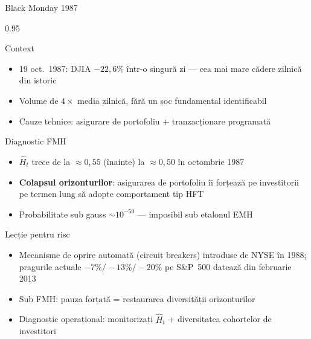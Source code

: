 \documentclass[9pt, aspectratio=169, t]{beamer}
\begin{document}
\begin{frame}[shrink=15]{Black Monday 1987}
\begin{cminipage}{0.95\textwidth}
\begin{block}{Context}
\begin{itemize}\setlength{\itemsep}{0pt}
    \item 19 oct.\ 1987: DJIA $-22{,}6\%$ într-o singură zi --- cea mai mare cădere zilnică din istoric
    \item Volume de $4\times$ media zilnică, fără un șoc fundamental identificabil
    \item Cauze tehnice: asigurare de portofoliu + tranzacționare programată
\end{itemize}
\end{block}
\begin{alertblock}{Diagnostic FMH}
\begin{itemize}\setlength{\itemsep}{0pt}
    \item $\hat H_t$ trece de la $\approx 0{,}55$ (înainte) la $\approx 0{,}50$ în octombrie 1987
    \item \textbf{Colapsul orizonturilor}: asigurarea de portofoliu îi forțează pe investitorii pe termen lung să adopte comportament tip HFT
    \item Probabilitate sub gauss $\sim 10^{-50}$ --- imposibil sub etalonul EMH
\end{itemize}
\end{alertblock}
\begin{exampleblock}{Lecție pentru risc}
\begin{itemize}\setlength{\itemsep}{0pt}
    \item Mecanisme de oprire automată (circuit breakers) introduse de NYSE în 1988; pragurile actuale $-7\%/-13\%/-20\%$ pe S\&P~500 datează din februarie 2013
    \item Sub FMH: pauza forțată = restaurarea diversității orizonturilor
    \item Diagnostic operațional: monitorizați $\hat H_t$ + diversitatea cohortelor de investitori
\end{itemize}
\end{exampleblock}
\end{cminipage}
\end{frame}
\end{document}
